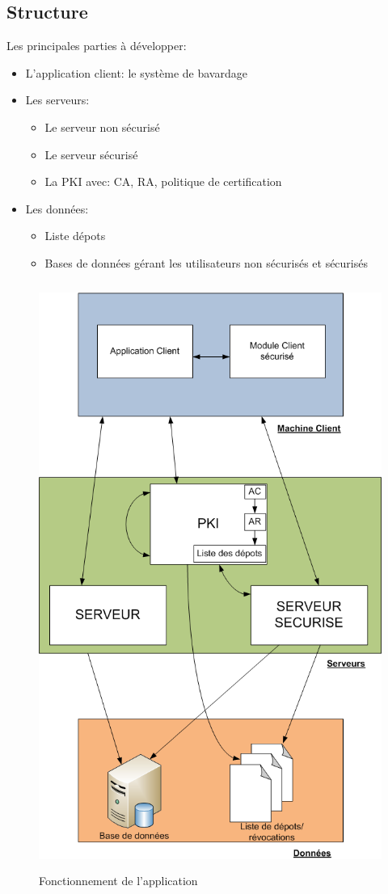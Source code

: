 \documentclass[a4paper,11pt,french]{article}
\begin{document}
\subsection{Structure}
Les principales parties à développer:
\begin{itemize}
\item L'application client: le système de bavardage
\item Les serveurs:
\begin{itemize}
\item Le serveur non sécurisé
\item Le serveur sécurisé
\item La PKI avec: CA, RA, politique de certification
\end{itemize}
\item Les données:
\begin{itemize}
\item Liste dépots
\item Bases de données gérant les utilisateurs non sécurisés et sécurisés
\end{itemize}
\end{itemize}

\begin{figure}[!htbp]
\centerline{\includegraphics[width=12cm,height=19.2cm]{Arch.png} }
\caption{Fonctionnement de l'application}
\end{figure}
\end{document}
